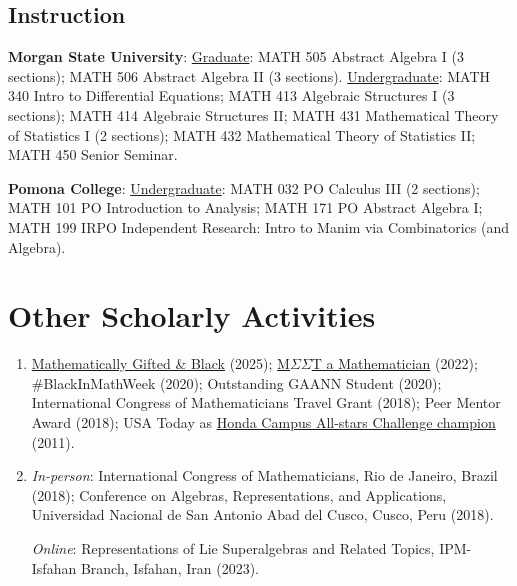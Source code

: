 \documentclass[11pt]{article}
\newcommand{\MSU}{Morgan State University}
\newcommand{\Pomona}{Pomona College}
\begin{document}
\subsection{Instruction}
\textbf{\MSU}:
\href{https://catalog.morgan.edu/content.php?filter\%5B27\%5D=MATH\&filter\%5B29\%5D=\&filter\%5Bcourse\_type\%5D=-1\&filter\%5Bkeyword\%5D=\&filter\%5B32\%5D=1\&filter\%5Bcpage\%5D=1\&cur\_cat\_oid=27\&expand=\&navoid=1991\&search\_database=Filter\#acalog\_template\_course\_filter}{Graduate}: MATH 505 Abstract Algebra I (3 sections); MATH 506 Abstract Algebra II (3 sections). \href{https://catalog.morgan.edu/content.php?filter\%5B27\%5D=MATH\&filter\%5B29\%5D=\&filter\%5Bcourse\_type\%5D=-1\&filter\%5Bkeyword\%5D=\&filter\%5B32\%5D=1\&filter\%5Bcpage\%5D=1\&cur\_cat\_oid=26\&expand=\&navoid=1881\&search\_database=Filter\#acalog\_template\_course\_filter}{Undergraduate}:
MATH 340 Intro to Differential Equations; MATH 413 Algebraic Structures I (3 sections); MATH 414 Algebraic Structures II; MATH 431 Mathematical Theory of Statistics I (2 sections); MATH 432 Mathematical Theory of Statistics II; MATH 450 Senior Seminar.

\textbf{\Pomona}:
\href{https://coursedog-static-public.s3.us-east-2.amazonaws.com/pomona/2022-2023%20Pomona%20College%20Catalog.pdf}{Undergraduate}: MATH 032 PO Calculus III (2 sections); MATH 101 PO Introduction to Analysis;
MATH 171 PO Abstract Algebra I; MATH 199 IRPO Independent Research: Intro to Manim via Combinatorics (and Algebra).

\section{Other Scholarly Activities}
\begin{enumerate}[leftmargin=4cm] %
    \item[\textbf{Honors/Media:}]  \href{https://mathematicallygiftedandblack.com/honorees/dwight-anderson-williams-ii/}{Mathematically Gifted \& Black} (2025); \href{https://sites.google.com/view/meetamathematician/interviews}{M$\Sigma\Sigma$T a Mathematician} (2022); \#BlackInMathWeek (2020); Outstanding GAANN Student (2020); International Congress of Mathematicians Travel Grant (2018); Peer Mentor Award (2018); USA Today as \href{https://en.wikipedia.org/wiki/Honda_Campus_All-Star_Challenge#/media/File:Florida_A&M.jpg}{Honda Campus All-stars Challenge champion} (2011).
    \item[\textbf{Global Conferencing:}]
    \emph{In-person}: International Congress of Mathematicians, Rio de Janeiro, Brazil (2018); Conference on Algebras, Representations, and Applications, Universidad Nacional de San Antonio Abad del Cusco, Cusco, Peru (2018).

    \emph{Online}: Representations of Lie Superalgebras and Related Topics, IPM-Isfahan Branch, Isfahan, Iran (2023).
\end{enumerate}
\end{document}
